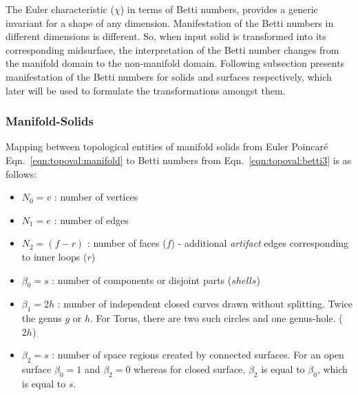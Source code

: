 
The Euler characteristic ($\chi$) in terms of Betti numbers, provides a generic invariant for a shape of any dimension. Manifestation of the Betti numbers in different dimensions is different. So, when input solid is transformed into its corresponding midsurface, the interpretation of the Betti number changes from the manifold domain to the non-manifold domain. Following subsection presents manifestation of the Betti numbers for solids and surfaces respectively, which later will be used to formulate the transformations amongst them.

\subsubsection{Manifold-Solids}

Mapping between topological entities of manifold solids from Euler Poincar\'e Eqn.~\ref{eqn:topoval:manifold} to Betti numbers from Eqn.~\ref{eqn:topoval:betti3} is as follows:

\begin{itemize}
[noitemsep,topsep=2pt,parsep=2pt,partopsep=2pt,label={}]
\item $N_{0} = v $ : number of vertices
\item $N_{1} = e $ : number of edges
\item $N_{2} = (f - r)$ : number of faces ($f$) - additional {\em artifact} edges corresponding to inner loops ($r$)
\item $\beta_{0} = s$ : number of components or disjoint parts ($shells$)
\item $\beta_{1} = 2h$ : number of independent closed curves drawn without splitting. Twice the genus $g$ or $h$. For Torus, there are two such circles and one genus-hole. ($2h$)
\item $\beta_{2} = s$ : number of space regions created by connected surfaces. For an open surface $\beta_{0} = 1$ and $\beta_{2}=0$ whereas for closed surface,  $\beta_{2}$ is equal to $\beta_{0}$,  which is equal to $s$.
\end{itemize}

